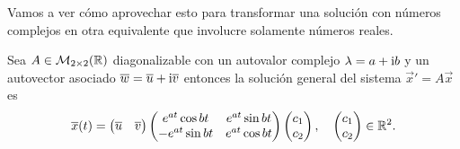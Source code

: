 \documentclass[../ecuaciones_diferenciales.tex]{subfiles}
\begin{document}
Vamos a ver cómo aprovechar esto para transformar una solución con números 
complejos en otra equivalente que involucre solamente números reales. 

\begin{proposition}
	Sea \(A \in \mathcal{M}_{2 \times 2}(\mathbb{R})\) diagonalizable con un autovalor 
	complejo \(\lambda = a + \mathrm{i} b\) y un autovector asociado 
	\(\overline{w} = \overline{u} + \mathrm{i}\overline{v}\) entonces la solución general del sistema
	\(\vec{x}' = A\vec{x}\) es
	\[\overline{x}(t) = \begin{pmatrix}\overline{u} & \overline{v}\end{pmatrix} 
		\begin{pmatrix}e^{at}\cos bt & e^{at}\sin bt \\ -e^{at} \sin bt & e^{at}
		\cos bt\end{pmatrix} \begin{pmatrix}c_1 \\ c_2\end{pmatrix}, \quad \begin{pmatrix}c_1 \\ c_2\end{pmatrix} \in \mathbb{R}^2.\]
\end{proposition}
\end{document}
